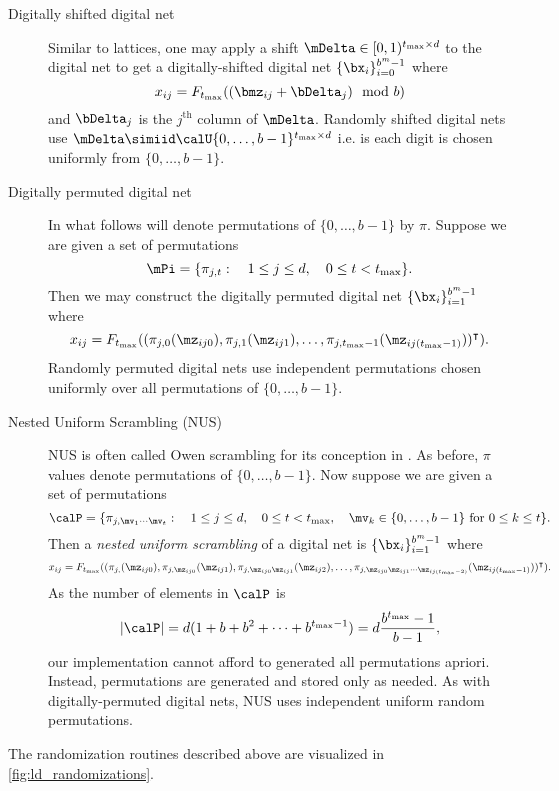 \documentclass[acmsmall]{acmart}
\begin{document}
\begin{description}
    \item[Digitally shifted digital net] Similar to lattices, one may apply a shift $\mDelta \in [0,1)^{t_\mathrm{max} \times d}$ to the digital net to get a digitally-shifted digital net $\{\bx_i\}_{i=0}^{b^m-1}$ where 
    $$x_{ij} = F_{t_\mathrm{max}}((\bmz_{ij} + \bDelta_j ) \mod b)$$
    and $\bDelta_j$ is the $j^\mathrm{th}$ column of $\mDelta$. Randomly shifted digital nets use $\mDelta \simiid \calU\{0,\dots,b-1\}^{t_\mathrm{max} \times d}$ i.e. is each digit is chosen uniformly from $\{0,\dots,b-1\}$. 
    \item[Digitally permuted digital net] In what follows will denote permutations of $\{0,\dots,b-1\}$ by $\pi$. Suppose we are given a set of permutations
    $$\mPi = \{\pi_{j,t}: \quad 1 \leq j \leq d, \quad 0 \leq t < t_\mathrm{max}\}.$$
    Then we may construct the digitally permuted digital net $\{\bx_i\}_{i=1}^{b^m-1}$ where 
    $$x_{ij} = F_{t_\mathrm{max}}((\pi_{j,0}(\mz_{ij0}),\pi_{j,1}(\mz_{ij1}),\dots,\pi_{j,t_\mathrm{max}-1}(\mz_{ij(t_\mathrm{max}-1)}))^\intercal).$$
    Randomly permuted digital nets use independent permutations chosen uniformly over all permutations of $\{0,\dots,b-1\}$. 
    \item[Nested Uniform Scrambling (NUS)] NUS is often called Owen scrambling for its conception in \citep{owen1995randomly}. As before, $\pi$ values denote permutations of $\{0,\dots,b-1\}$. Now suppose we are given a set of permutations 
    $$\calP = \{\pi_{j,\mv_1\cdots\mv_t}: \quad 1 \leq j \leq d, \quad 0 \leq t < t_\mathrm{max}, \quad \mv_k \in \{0,\dots,b-1\} \text{ for } 0 \leq k \leq t \}.$$
    Then a \emph{nested uniform scrambling} of a digital net is $\{\bx_i\}_{i=1}^{b^m-1}$ where
    $$x_{ij} = F_{t_\mathrm{max}}((\pi_{j,}(\mz_{ij0}),\pi_{j,\mz_{ij0}}(\mz_{ij1}),\pi_{j,\mz_{ij0}\mz_{ij1}}(\mz_{ij2}),\dots,\pi_{j,\mz_{ij0}\mz_{ij1}\cdots\mz_{ij(t_\mathrm{max}-2)}}(\mz_{ij(t_\mathrm{max}-1)}))^\intercal).$$ 
    As the number of elements in $\calP$ is  
    $$\lvert \calP \rvert = d(1+b+b^2+\dots+b^{t_\mathrm{max}-1}) = d \frac{b^{t_\mathrm{max}}-1}{b-1},$$ 
    our implementation cannot afford to generated all permutations apriori. Instead, permutations are generated and stored only as needed. As with digitally-permuted digital nets, NUS uses independent uniform random permutations.  
\end{description}
The randomization routines described above are visualized in \cref{fig:ld_randomizations}. 
\end{document}
